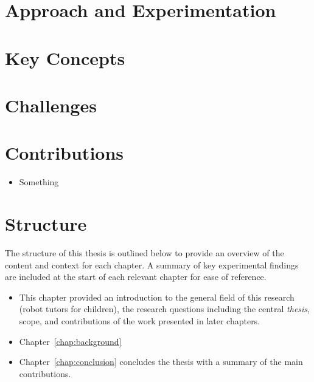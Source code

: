 \section{Approach and Experimentation}\label{sec:intro-exps}

\section{Key Concepts}\label{sec:intro-concepts}

\section{Challenges}

\section{Contributions}\label{sec:intro-contr}

\begin{itemize}
	\item Something 
\end{itemize}

\section{Structure}\label{sec:intro-struct}
The structure of this thesis is outlined below to provide an overview of the content and context for each chapter. A summary of key experimental findings are included at the start of each relevant chapter for ease of reference. 

\begin{itemize}
\item This chapter provided an introduction to the general field of this research (robot tutors for children), the research questions including the central \textit{thesis}, scope, and contributions of the work presented in later chapters.  

\item Chapter~\ref{chap:background} 



\item Chapter~\ref{chap:conclusion} concludes the thesis with a summary of the main contributions.

\end{itemize}
